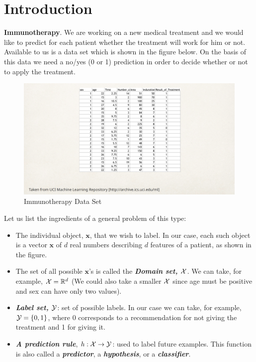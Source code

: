 \section{Introduction}

\begin{example}
\textbf{Immunotherapy}. We are working on a new medical treatment and we would like to predict for each patient whether the treatment will work for him or not.
Available to us is a data set which is shown in the figure below. On the basis of this data we need a no/yes (0 or 1) prediction in order to decide whether or not to apply the treatment.
\begin{figure}[h!]
  \centering
    \includegraphics[scale=0.3]{chapters/pac/figures/ImmunotherapyDataSet.png}
    \caption{Immunotherapy Data Set}
\end{figure}
\end{example}

Let us list the ingredients of a general problem of this type:

\begin{itemize}
 \item The individual object, $\mathbf{x}$, that we wish to label. In our case, each such object is a vector $\mathbf{x}$ of $d$ real numbers describing $d$ features of a patient, as shown in the figure.
 \item The set of all possible $\mathbf{x}$'s is called the \textit{\textbf{Domain set, $\mathcal{X}$}}. We can take, for example,  $\mathcal{X}= \mathbb{R}^d$ (We could also take a smaller $\mathcal{X}$ since age must be positive and sex can have only two values).
 \item \textit{\textbf{Label set, $\mathcal{Y}$}}: set of possible labels. In our case we can take, for example,  $\mathcal{Y}=\{0,1\}$, where $0$ corresponds to a recommendation for not giving the treatment and 1 for giving it.
 \item \textit{\textbf{A prediction rule}}, $h:\mathcal{X}\to \mathcal{Y}$: used to label future examples. This function is also called a \textit{\textbf{predictor}}, a \textit{\textbf{hypothesis}}, or a  \textit{\textbf{classifier}}.
\end{itemize}


